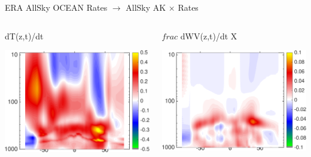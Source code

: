 \documentclass[10pt,t]{beamer}
\begin{document}
\begin{frame}{ERA AllSky OCEAN Rates $\rightarrow$ AllSky AK $\times$ Rates}
\vspace{-0.35in}

\begin{columns}
\begin{column}{0.45\columnwidth}
\begin{block}{\footnotesize dT(z,t)/dt}
\vspace{-0.1in}
\begin{center}
\includegraphics[width=\linewidth]{Figs/CloudAnom/Desc/ak_x_ERAtzrates.png}
\end{center}
\end{block}
\end{column}

\begin{column}{0.45\columnwidth}
\begin{block}{\footnotesize $frac$ dWV(z,t)/dt}
\vspace{-0.1in}
X\begin{center}
\includegraphics[width=\linewidth]{Figs/CloudAnom/Desc/ak_x_ERAwvrates.png}
\end{center}
\end{block}
\end{column}
\end{columns}


\end{frame}
\end{document}

